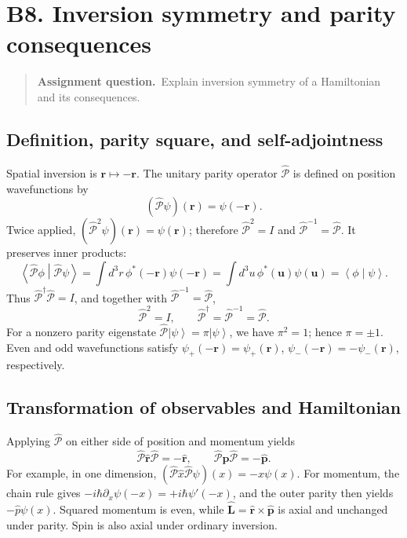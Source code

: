 \documentclass[11pt,a4paper]{article}
\theoremstyle{definition}
\newcommand{\ket}[1]{\left|#1\right\rangle}
\newcommand{\ip}[2]{\left\langle#1\middle|#2\right\rangle}
\newcommand{\PP}{\hat{\mathcal P}}
\newenvironment{question}{\begin{quote}\small\noindent\textbf{Assignment question.}\ }{\end{quote}}
\begin{document}
\section{B8. Inversion symmetry and parity consequences}
\begin{question}Explain inversion symmetry of a Hamiltonian and its consequences.\end{question}
\subsection{Definition, parity square, and self-adjointness}
Spatial inversion is \(\mathbf r\mapsto-\mathbf r\). The unitary parity operator \(\PP\) is defined on position wavefunctions by
\begin{equation}
\boxed{(\PP\psi)(\mathbf r)=\psi(-\mathbf r).}
\end{equation}
Twice applied, \((\PP^2\psi)(\mathbf r)=\psi(\mathbf r)\); therefore \(\PP^2=I\) and \(\PP^{-1}=\PP\). It preserves inner products:
\begin{equation}
\ip{\PP\phi}{\PP\psi}=\int d^3r\,\phi^*(-\mathbf r)\psi(-\mathbf r)
=\int d^3u\,\phi^*(\mathbf u)\psi(\mathbf u)=\ip\phi\psi.
\end{equation}
Thus \(\PP^\dagger\PP=I\), and together with \(\PP^{-1}=\PP\),
\begin{equation}
\boxed{\PP^2=I,\qquad \PP^\dagger=\PP^{-1}=\PP.}
\end{equation}
For a nonzero parity eigenstate \(\PP\ket\psi=\pi\ket\psi\), we have \(\pi^2=1\); hence \(\pi=\pm1\). Even and odd wavefunctions satisfy \(\psi_+(-\mathbf r)=\psi_+(\mathbf r)\), \(\psi_-(-\mathbf r)=-\psi_-(\mathbf r)\), respectively.
\subsection{Transformation of observables and Hamiltonian}
Applying \(\PP\) on either side of position and momentum yields
\begin{equation}
\boxed{\PP\hat{\mathbf r}\PP=-\hat{\mathbf r},\qquad
\PP\hat{\mathbf p}\PP=-\hat{\mathbf p}.}
\end{equation}
For example, in one dimension, \((\PP\hat x\PP\psi)(x)=-x\psi(x)\). For momentum, the chain rule gives \(-i\hbar\partial_x\psi(-x)=+i\hbar\psi'(-x)\), and the outer parity then yields \(-\hat p\psi(x)\). Squared momentum is even, while \(\hat{\mathbf L}=\hat{\mathbf r}\times\hat{\mathbf p}\) is axial and unchanged under parity. Spin is also axial under ordinary inversion.
\end{document}
